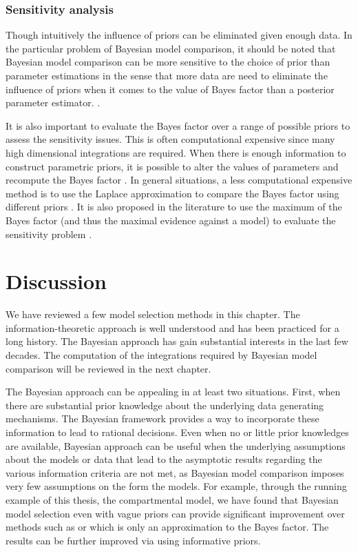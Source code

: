 

\subsubsection{Sensitivity analysis}
\label{ssub:Sensitivity analysis}

Though intuitively the influence of priors can be eliminated given enough
data. In the particular problem of Bayesian model comparison, it should be
noted that Bayesian model comparison can be more sensitive to the choice of
prior than parameter estimations in the sense that more data are need
to eliminate the influence of priors when it comes to the value of Bayes
factor than a posterior parameter estimator.
\cite{Kass:1993vy,Kass:1995vb}.

It is also important to evaluate the Bayes factor over a range of possible
priors to assess the sensitivity issues. This is often computational expensive
since many high dimensional integrations are required. When there is enough
information to construct parametric priors, it is possible to alter the values
of parameters and recompute the Bayes factor \cite{McCulloch:1991hj}. In
general situations, a less computational expensive method is to use the
Laplace approximation to compare the Bayes factor using different priors
\cite{Kass:1992tz}. It is also proposed in the literature to use the maximum
of the Bayes factor (and thus the maximal evidence against a model) to
evaluate the sensitivity problem \cite{Berger:1987iq}.

\section{Discussion}
\label{sec:Model Selection Discussion}

We have reviewed a few model selection methods in this chapter. The
information-theoretic approach is well understood and has been practiced for
a long history. The Bayesian approach has gain substantial interests in the
last few decades. The computation of the integrations required by Bayesian
model comparison will be reviewed in the next chapter.

The Bayesian approach can be appealing in at least two situations. First, when
there are substantial prior knowledge about the underlying data generating
mechanisms. The Bayesian framework provides a way to incorporate these
information to lead to rational decisions. Even when no or little prior
knowledges are available, Bayesian approach can be useful when the underlying
assumptions about the models or data that lead to the asymptotic results
regarding the various information criteria are not met, as Bayesian model
comparison imposes very few assumptions on the form the models. For example,
through the running example of this thesis, the \pet compartmental model, we
have found that Bayesian model selection even with vague priors can provide
significant improvement over methods such as \aicc or \bic which is only an
approximation to the Bayes factor. The results can be further improved via
using informative priors.

